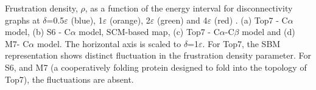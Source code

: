 \documentclass[a0paper,portrait]{baposter}
\begin{document}
\begin{poster}
{\begin{center}
\end{center}
Frustration density, $\rho$, as a function of the energy interval for disconnectivity graphs at $\delta$=0.5$\varepsilon$ (blue), 1$\varepsilon$ (orange), 2$\varepsilon$ (green) and 4$\varepsilon$ (red) . (a) Top7 - C$\alpha$ model, (b) S6 - C$\alpha$ model, SCM-based map, (c) Top7 - C$\alpha$-C$\beta$ model and (d) M7- C$\alpha$ model. The horizontal axis is scaled to $\delta$=1$\varepsilon$. For Top7, the SBM representation shows distinct fluctuation in the frustration density parameter. For S6, and M7 (a cooperatively folding protein designed to fold into the topology of Top7), the fluctuations are absent.}

\end{poster}
\end{document}
